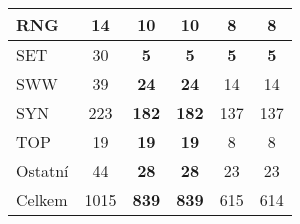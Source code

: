 \begin{longtable}{l|c|c|c|c|c}
\hline
{\footnotesize RNG} & {\footnotesize 14} & \textbf{10} & \textbf{10} & {\footnotesize 8} & {\footnotesize 8}\\
\hline
{\footnotesize SET} & {\footnotesize 30} & \textbf{5} & \textbf{5} & \textbf{5} & \textbf{5}\\
\hline
{\footnotesize SWW} & {\footnotesize 39} & \textbf{24} & \textbf{24} & {\footnotesize 14} & {\footnotesize 14}\\
\hline
{\footnotesize SYN} & {\footnotesize 223} & \textbf{182} & \textbf{182} & {\footnotesize 137} & {\footnotesize 137}\\
\hline
{\footnotesize TOP} & {\footnotesize 19} & \textbf{19} & \textbf{19} & {\footnotesize 8} & {\footnotesize 8}\\
\hline
{\footnotesize Ostatní} & {\footnotesize 44} & \textbf{28} & \textbf{28} & {\footnotesize 23} & {\footnotesize 23}\\
\hline
\hline
{\footnotesize Celkem} & {\footnotesize 1015} & \textbf{839} & \textbf{839} & {\footnotesize 615} & {\footnotesize 614}\\
\hline
\end{longtable}
